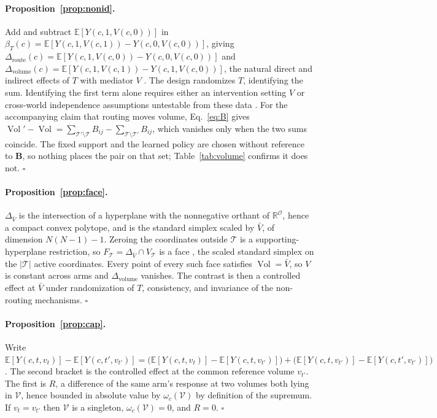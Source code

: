\documentclass[11pt]{article}
\newcommand{\Vol}{\operatorname{Vol}}
\begin{document}
\paragraph{Proposition~\ref{prop:nonid}.}
Add and subtract $\mathbb{E}[Y(c,1,V(c,0))]$ in
$\beta_T(c)=\mathbb{E}[Y(c,1,V(c,1))-Y(c,0,V(c,0))]$, giving
$\Delta_{\mathrm{route}}(c)=\mathbb E[Y(c,1,V(c,0))-Y(c,0,V(c,0))]$ and
$\Delta_{\mathrm{volume}}(c)=\mathbb E[Y(c,1,V(c,1))-Y(c,1,V(c,0))]$, the
natural direct and indirect effects of $T$ with mediator $V$
\citep{robins1992identifiability,pearl2001direct}. The design randomizes $T$,
identifying the sum. Identifying the first term alone requires either an
intervention setting $V$ or cross-world independence assumptions untestable from
these data \citep{vanderweele2015explanation}. For the accompanying claim that
routing moves volume, Eq.~\ref{eq:B} gives
$\Vol'-\Vol=\sum_{\mathcal{T}'\setminus\mathcal{T}}B_{ij}
-\sum_{\mathcal{T}\setminus\mathcal{T}'}B_{ij}$, which vanishes only when the two
sums coincide. The fixed support and the learned policy are chosen without
reference to $\mathbf{B}$, so nothing places the pair on that set;
Table~\ref{tab:volume} confirms it does not. $\square$

\paragraph{Proposition~\ref{prop:face}.}
$\Delta_{\bar V}$ is the intersection of a hyperplane with the nonnegative
orthant of $\mathbb{R}^{\mathcal{O}}$, hence a compact convex polytope, and is
the standard simplex scaled by $\bar V$, of dimension $N(N{-}1)-1$. Zeroing the
coordinates outside $\mathcal{T}$ is a supporting-hyperplane restriction, so
$F_{\mathcal{T}}=\Delta_{\bar V}\cap V_{\mathcal{T}}$ is a face
\citep{ziegler1995polytopes}, the scaled standard simplex on the $|\mathcal{T}|$
active coordinates. Every point of every such face satisfies $\Vol=\bar V$, so
$V$ is constant across arms and $\Delta_{\mathrm{volume}}$ vanishes. The
contrast is then a controlled effect at $\bar V$ under randomization of $T$,
consistency, and invariance of the non-routing mechanisms. $\square$

\paragraph{Proposition~\ref{prop:cap}.}
Write
$\mathbb E[Y(c,t,v_t)]-\mathbb E[Y(c,t',v_{t'})]
=\bigl(\mathbb E[Y(c,t,v_t)]-\mathbb E[Y(c,t,v_{t'})]\bigr)
+\bigl(\mathbb E[Y(c,t,v_{t'})]-\mathbb E[Y(c,t',v_{t'})]\bigr)$. The second
bracket is the controlled effect at the common reference volume $v_{t'}$. The
first is $R$, a difference of the same arm's response at two volumes both lying
in $\mathcal V$, hence bounded in absolute value by $\omega_c(\mathcal V)$ by
definition of the supremum. If $v_t=v_{t'}$ then $\mathcal V$ is a singleton,
$\omega_c(\mathcal V)=0$, and $R=0$. $\square$
\end{document}
